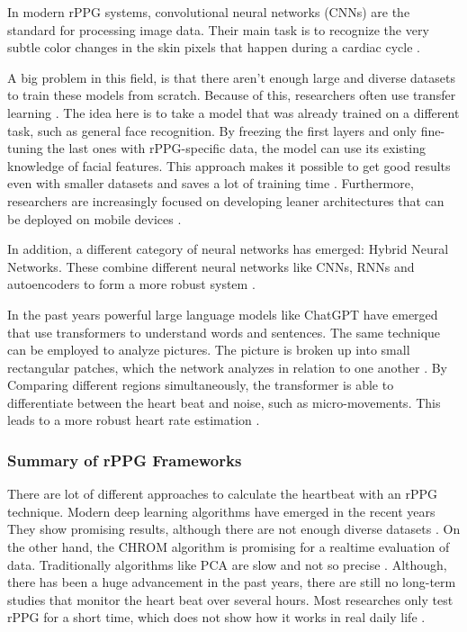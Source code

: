 In modern rPPG systems, convolutional neural networks (CNNs) are the standard for processing image data. Their main task is to recognize the very subtle color changes in the skin pixels that happen during a cardiac cycle \cite{Debnath25}.

A big problem in this field, is that there aren't enough large and diverse datasets to train these models from scratch. Because of this, researchers often use transfer learning \cite{Debnath25}. The idea here is to take a model that was already trained on a different task, such as general face recognition. By freezing the first layers and only fine-tuning the last ones with rPPG-specific data, the model can use its existing knowledge of facial features. This approach makes it possible to get good results even with smaller datasets and saves a lot of training time \cite{pan2009survey}.
Furthermore, researchers are increasingly focused on developing leaner architectures that can be deployed on mobile devices \cite{Debnath25}.

In addition, a different category of neural networks has emerged: Hybrid Neural Networks. These combine different neural networks like CNNs, RNNs and autoencoders to form a more robust system \cite{Debnath25}.

In the past years powerful large language models like ChatGPT have emerged that use transformers to understand words and sentences. The same technique can be employed to analyze pictures. The picture is broken up into small rectangular patches, which the network analyzes in relation to one another \cite{dosovitskiy2021an}. By Comparing different regions simultaneously, the transformer is able to differentiate between the heart beat and noise, such as micro-movements. This leads to a more robust heart rate estimation \cite{Debnath25}.

\subsubsection{Summary of rPPG Frameworks}
There are lot of different approaches to calculate the heartbeat with an rPPG technique. Modern deep learning algorithms have emerged in the recent years  They show promising results, although there are not enough diverse datasets \cite{Debnath25}. On the other hand, the CHROM algorithm is promising for a realtime evaluation of data. Traditionally algorithms like PCA are slow and not so precise \cite{dehaan2013chrom}.
Although, there has been a huge advancement in the past years, there are still no long-term studies that monitor the heart beat over several hours. Most researches only test rPPG for a short time, which does not show how it works in real daily life \cite{Debnath25}.







